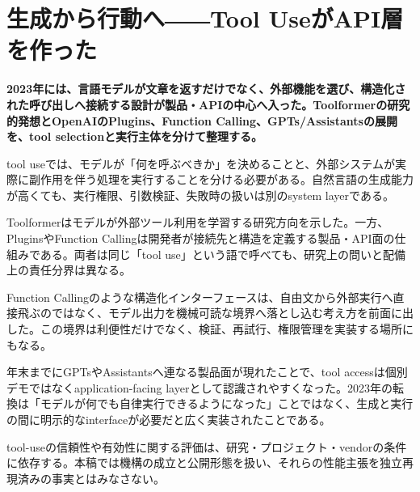 \section{生成から行動へ――Tool UseがAPI層を作った}
\label{pkg:tool-action-layer}
\noindent\textbf{2023年には、言語モデルが文章を返すだけでなく、外部機能を選び、構造化された呼び出しへ接続する設計が製品・APIの中心へ入った。Toolformerの研究的発想とOpenAIのPlugins、Function Calling、GPTs/Assistantsの展開を、tool selectionと実行主体を分けて整理する。}\autocite{src-150e07b331df,src-4de1cea0a896,src-6b76b870b4ae,src-97786632d087,src-e17d0bf10781}

tool useでは、モデルが「何を呼ぶべきか」を決めることと、外部システムが実際に副作用を伴う処理を実行することを分ける必要がある。自然言語の生成能力が高くても、実行権限、引数検証、失敗時の扱いは別のsystem layerである。\autocite{src-150e07b331df,src-4de1cea0a896,src-6b76b870b4ae,src-97786632d087,src-e17d0bf10781}


Toolformerはモデルが外部ツール利用を学習する研究方向を示した。一方、PluginsやFunction Callingは開発者が接続先と構造を定義する製品・API面の仕組みである。両者は同じ「tool use」という語で呼べても、研究上の問いと配備上の責任分界は異なる。\autocite{src-150e07b331df,src-4de1cea0a896,src-6b76b870b4ae,src-97786632d087,src-e17d0bf10781}


Function Callingのような構造化インターフェースは、自由文から外部実行へ直接飛ぶのではなく、モデル出力を機械可読な境界へ落とし込む考え方を前面に出した。この境界は利便性だけでなく、検証、再試行、権限管理を実装する場所にもなる。\autocite{src-4de1cea0a896,src-6b76b870b4ae,src-97786632d087,src-e17d0bf10781}


年末までにGPTsやAssistantsへ連なる製品面が現れたことで、tool accessは個別デモではなくapplication-facing layerとして認識されやすくなった。2023年の転換は「モデルが何でも自律実行できるようになった」ことではなく、生成と実行の間に明示的なinterfaceが必要だと広く実装されたことである。\autocite{src-4de1cea0a896,src-6b76b870b4ae,src-97786632d087,src-e17d0bf10781}


\begin{claimboundary}
tool-useの信頼性や有効性に関する評価は、研究・プロジェクト・vendorの条件に依存する。本稿では機構の成立と公開形態を扱い、それらの性能主張を独立再現済みの事実とはみなさない。\autocite{src-4de1cea0a896,src-6b76b870b4ae,src-97786632d087,src-e17d0bf10781}
\end{claimboundary}
